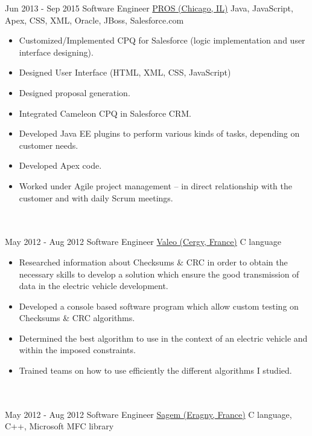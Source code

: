 \documentclass[letterpaper]{template} %
\begin{document}
\begin{twenty}
	\twentyitem
    	{Jun 2013 - Sep 2015}
		{}
        {Software Engineer}
        {\href{https://pros.com/}{PROS (Chicago, IL)}}
        {Java, JavaScript, Apex, CSS, XML, Oracle, JBoss, Salesforce.com}
        {\begin{itemize}
            \item Customized/Implemented CPQ for Salesforce (logic implementation and user interface designing).
            \item Designed User Interface (HTML, XML, CSS, JavaScript)
            \item Designed proposal generation. 
            \item Integrated Cameleon CPQ in Salesforce CRM.
            \item Developed Java EE plugins to perform various kinds of tasks, depending on customer needs.
            \item Developed Apex code.
            \item Worked under Agile project management – in direct relationship with the customer and with daily Scrum meetings.
        \end{itemize}}
    \\\divider\\
    \twentyitem
        {May 2012 - Aug 2012}
        {}
        {Software Engineer}
        {\href{https://www.valeo.com/en/}{Valeo (Cergy, France)}}
        {C language}
        {\begin{itemize}
            \item Researched information about Checksums \& CRC in order to obtain the necessary skills to develop a solution which ensure the good transmission of data in the electric vehicle development.
            \item Developed a console based software program which allow custom testing on Checksums \& CRC algorithms.
            \item Determined the best algorithm to use in the context of an electric vehicle and within the imposed constraints.
            \item Trained teams on how to use efficiently the different algorithms I studied.
        \end{itemize}}
    \\\divider\\
    \twentyitem
   		{May 2012 - Aug 2012}
		{}
        {Software Engineer}
        {\href{https://www.safran-group.com/}{Sagem (Eragny, France)}}
        {C language, C++, Microsoft MFC library}

\end{twenty}
\end{document}
